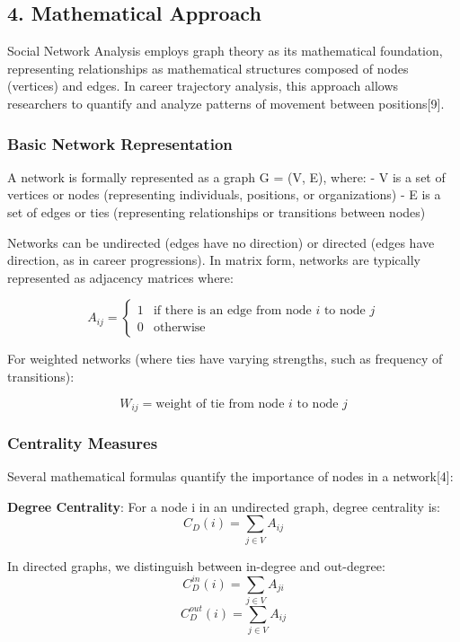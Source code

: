 \documentclass[
  letterpaper,
  DIV=11,
  numbers=noendperiod]{scrartcl}
\begin{document}
\subsection{4. Mathematical Approach}\label{mathematical-approach}

Social Network Analysis employs graph theory as its mathematical
foundation, representing relationships as mathematical structures
composed of nodes (vertices) and edges. In career trajectory analysis,
this approach allows researchers to quantify and analyze patterns of
movement between positions{[}9{]}.

\subsubsection{Basic Network
Representation}\label{basic-network-representation}

A network is formally represented as a graph G = (V, E), where: - V is a
set of vertices or nodes (representing individuals, positions, or
organizations) - E is a set of edges or ties (representing relationships
or transitions between nodes)

Networks can be undirected (edges have no direction) or directed (edges
have direction, as in career progressions). In matrix form, networks are
typically represented as adjacency matrices where:

\[ A_{ij} = \begin{cases} 
1 & \text{if there is an edge from node } i \text{ to node } j \\
0 & \text{otherwise}
\end{cases} \]

For weighted networks (where ties have varying strengths, such as
frequency of transitions):

\[ W_{ij} = \text{weight of tie from node } i \text{ to node } j \]

\subsubsection{Centrality Measures}\label{centrality-measures-1}

Several mathematical formulas quantify the importance of nodes in a
network{[}4{]}:

\textbf{Degree Centrality}: For a node i in an undirected graph, degree
centrality is: \[ C_D(i) = \sum_{j \in V} A_{ij} \]

In directed graphs, we distinguish between in-degree and out-degree:
\[ C_{D}^{in}(i) = \sum_{j \in V} A_{ji} \]
\[ C_{D}^{out}(i) = \sum_{j \in V} A_{ij} \]
\end{document}
